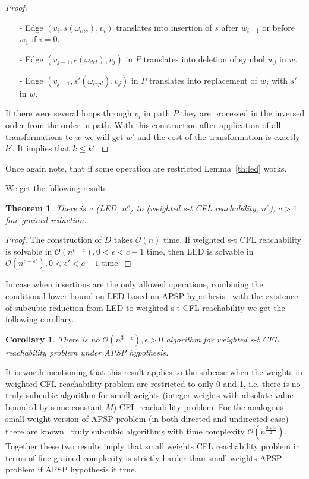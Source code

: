 \documentclass[12pt]{article}
\newtheorem{theorem}{Theorem}[section]
\newtheorem{cor}{Corollary}[section]
\begin{document}
\begin{proof}
\begin{itemize}
    \item[-] Edge $(v_{i}, s(\omega_{ins}), v_{i})$ translates into insertion of $s$ after $w_{i - 1}$ or before $w_1$ if $i = 0$.
    \item[-] Edge $(v_{j-1}, \epsilon(\omega_{del}), v_{j})$ in $P$ translates into deletion of symbol $w_j$ in $w$.
    \item[-] Edge $(v_{j-1}, s'(\omega_{repl}), v_{j})$ in $P$ translates into replacement of $w_j$ with $s'$ in $w$.
\end{itemize}

If there were several loops through $v_i$ in path $P$ they are processed in the inversed order from the order in path. With this construction after application of all transformations to $w$ we will get $w'$ and the cost of the transformation is exactly $k'$. It implies that $k \le k'$.
\end{proof}

Once again note, that if some operation are restricted Lemma~\ref{th:led} works.

We get the following results.

\begin{theorem}
There is a (LED, $n^c$) to (weighted s-t CFL reachability, $n^c$), $c > 1$ fine-grained reduction.
\end{theorem}

\begin{proof}
The construction of $D$ takes $\mathcal{O}(n)$ time. If weighted s-t CFL reachability is solvable in $\mathcal{O}(n^{c - \epsilon}), 0 < \epsilon < c - 1$ time, then LED is solvable in $\mathcal{O}(n^{c - \epsilon'}), 0 < \epsilon' < c - 1$ time.
\end{proof}

In case when insertions are the only allowed operations, combining the conditional lower bound on LED based on APSP hypothesis~\cite{DBLP:journals/corr/Saha14, 10.1145/3186893} with the existence of subcubic reduction from LED to weighted s-t CFL reachability we get the following corollary.

\begin{cor}
There is no $\mathcal{O}(n^{3 - \epsilon}), \epsilon > 0$ algorithm for weighted s-t CFL reachability problem under APSP hypothesis.
\end{cor}

It is worth mentioning that this result applies to the subcase when the weights in weighted CFL reachability problem are restricted to only 0 and 1, i.e. there is no truly subcubic algorithm for small weights (integer weights with absolute value bounded by some constant $M$)  CFL reachability problem. For the analogous small weight version of APSP problem (in both directed and undirected case) there are known~\cite{10.1006/jcss.1997.1388} truly subcubic algorithms with time complexity $\mathcal{O}(n^{\frac{3+\omega}{2}})$. Together these two results imply that small weights CFL reachability problem in terms of fine-grained complexity is strictly harder than small weights APSP problem if APSP hypothesis it true.
\end{document}
